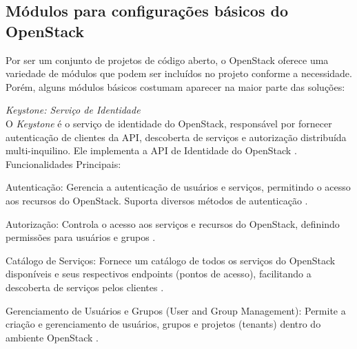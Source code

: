 \subsection{Módulos para configurações básicos do OpenStack}

Por ser um conjunto de projetos de código aberto, o OpenStack oferece uma variedade de módulos que podem ser incluídos no projeto conforme a necessidade. Porém, alguns módulos básicos costumam aparecer na maior parte das soluções:

\begin{description}
    \item \emph{Keystone: Serviço de Identidade}\\
    O \textit{Keystone} é o serviço de identidade do OpenStack, responsável por fornecer autenticação de clientes da API, descoberta de serviços e autorização distribuída multi-inquilino. Ele implementa a API de Identidade do OpenStack \cite{openstackkeystone}.\\
    Funcionalidades Principais:
    \begin{description}
        \item Autenticação: Gerencia a autenticação de usuários e serviços, permitindo o acesso aos recursos do OpenStack. Suporta diversos métodos de autenticação \cite{openstackkeystone}.
        \item Autorização: Controla o acesso aos serviços e recursos do OpenStack, definindo permissões para usuários e grupos \cite{openstackkeystone}.
        \item Catálogo de Serviços: Fornece um catálogo de todos os serviços do OpenStack disponíveis e seus respectivos endpoints (pontos de acesso), facilitando a descoberta de serviços pelos clientes \cite{openstackkeystone}.
        \item Gerenciamento de Usuários e Grupos (User and Group Management): Permite a criação e gerenciamento de usuários, grupos e projetos (tenants) dentro do ambiente OpenStack \cite{openstackkeystone}.
    \end{description}


\end{description}
